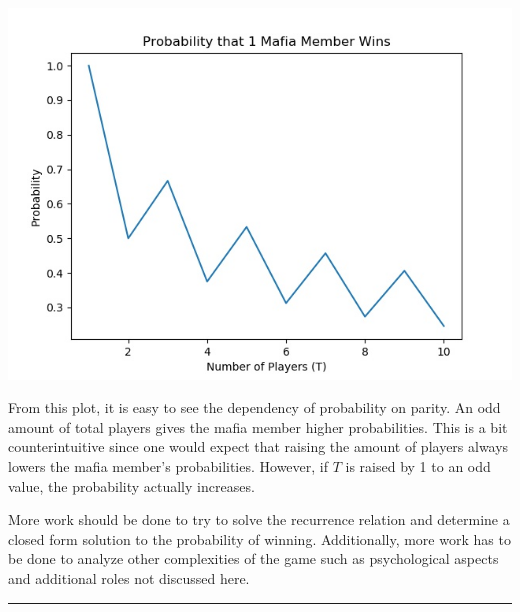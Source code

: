 \documentclass[12pt]{article}
\begin{document}
\begin{center}
	\includegraphics[width = \linewidth]{images/simple/simulation_results_1}
\end{center}

From this plot, it is easy to see the dependency of probability on parity. An odd amount of total players gives the mafia member higher probabilities. This is a bit counterintuitive since one would expect that raising the amount of players always lowers the mafia member's probabilities. However, if $T$ is raised by 1 to an odd value, the probability actually increases. 

More work should be done to try to solve the recurrence relation and determine a closed form solution to the probability of winning. Additionally, more work has to be done to analyze other complexities of the game such as psychological aspects and additional roles not discussed here.

\rule{\linewidth}{1pt}
\end{document}
